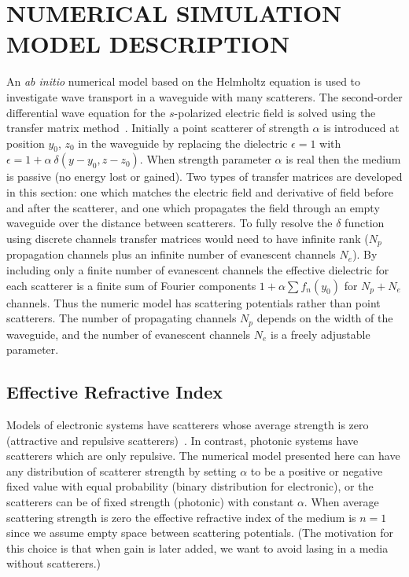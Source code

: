 \section{NUMERICAL SIMULATION MODEL DESCRIPTION}
\label{sec:numericalSim}

An \textit{ab initio} numerical model based on the Helmholtz equation is used to investigate wave transport in a waveguide with many scatterers. The second-order differential wave equation for the $s$-polarized electric field is solved using the transfer matrix method~\cite{1981_MacKinnon_scaling,1992_Pendry,2003_Kettemann}. Initially a point scatterer of strength $\alpha$ is introduced at position $y_0$, $z_0$ in the waveguide by replacing the dielectric $\epsilon=1$ with $\epsilon = 1+ \alpha\ \delta(y-y_0,z-z_0)$. When strength parameter $\alpha$ is real then the medium is passive (no energy lost or gained). Two types of transfer matrices are developed in this section: one which matches the electric field and derivative of field before and after the scatterer, and one which propagates the field through an empty waveguide over the distance between scatterers. To fully resolve the $\delta$ function using discrete channels transfer matrices would need to have infinite rank ($N_p$ propagation channels plus an infinite number of evanescent channels $N_e$). By including only a finite number of evanescent channels the effective dielectric for each scatterer is a finite sum of Fourier components $1+ \alpha \sum f_n(y_0)$ for $N_p+N_e$ channels. Thus the numeric model has scattering potentials rather than point scatterers. The number of propagating channels $N_p$ depends on the width of the waveguide, and the number of evanescent channels $N_e$ is a freely adjustable parameter.

\subsection{Effective Refractive Index}
Models of electronic systems have scatterers whose average strength is zero (attractive and repulsive scatterers)~\cite{2007_Froufe-Perez_PRE}. In contrast, photonic systems have scatterers which are only repulsive. The numerical model presented here can have any distribution of scatterer strength by setting $\alpha$ to be a positive or negative fixed value with equal probability (binary distribution for electronic), or the scatterers can be of fixed strength (photonic) with constant $\alpha$. When average scattering strength is zero the effective refractive index of the medium is $n=1$ since we assume empty space between scattering potentials. (The motivation for this choice is that when gain is later added, we want to avoid lasing in a media without scatterers.) 

